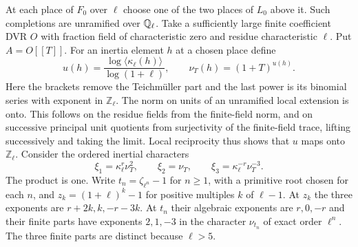 \documentclass[a4paper,11pt]{article}
\theoremstyle{definition}
\theoremstyle{remark}
\newcommand{\ZZ}{\mathbb Z}\newcommand{\ord}{\operatorname{ord}}
\numberwithin{equation}{section}
\begin{document}
At each place of \(F_0\) over \(\ell\) choose one of the two
places of \(L_0\) above it. Such completions are unramified over
\(\mathbb Q_\ell\). Take a sufficiently large finite coefficient DVR
\(O\) with fraction field of characteristic zero and residue
characteristic \(\ell\). Put \(A=O[[T]]\). For an inertia element
\(h\) at a chosen place define
\[
 u(h)=\frac{\log\langle\kappa_\ell(h)\rangle}{\log(1+\ell)},
 \qquad \nu_T(h)=(1+T)^{u(h)} .
\]
Here the brackets remove the Teichm\"uller part and the last power
is its binomial series with exponent in \(\ZZ_\ell\). The norm on
units of an unramified local extension is onto. This follows on
the residue fields from the finite-field norm, and on successive
principal unit quotients from surjectivity of the finite-field
trace, lifting successively and taking the limit. Local
reciprocity thus shows that \(u\) maps onto \(\ZZ_\ell\).
Consider the ordered inertial characters
\begin{equation}
   \xi_1=\kappa_\ell^r\nu_T^2,\qquad
   \xi_2=\nu_T,\qquad
   \xi_3=\kappa_\ell^{-r}\nu_T^{-3}.                 \label{eq:weights363}
\end{equation}
The product is one. Write \(t_n=\zeta_{\ell^n}-1\) for \(n\ge1\),
with a primitive root chosen for each \(n\), and
\(z_k=(1+\ell)^k-1\) for positive multiples \(k\) of \(\ell-1\).
At \(z_k\) the three exponents are \(r+2k,k,-r-3k\).
At \(t_n\) their algebraic exponents are \(r,0,-r\) and their
finite parts have exponents \(2,1,-3\) in the character
\(\nu_{t_n}\) of exact order \(\ell^n\). The three finite parts
are distinct because \(\ell>5\).
\end{document}
